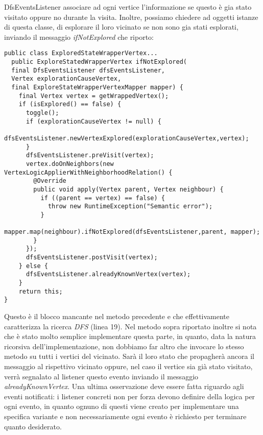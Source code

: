 \begin{paragraph}{DfsEventsListener}
associare ad ogni vertice l'informazione se questo \`e gia stato
visitato oppure no durante la visita. Inoltre, possiamo chiedere ad
oggetti istanze di questa classe, di esplorare il loro vicinato se non
sono gia stati esplorati, inviando il messaggio \emph{ifNotExplored}
che riporto:
\begin{lstlisting}
public class ExploredStateWrapperVertex...
  public ExploreStatedWrapperVertex ifNotExplored(
  final DfsEventsListener dfsEventsListener,
  Vertex explorationCauseVertex,
  final ExploreStateWrapperVertexMapper mapper) {
    final Vertex vertex = getWrappedVertex();
    if (isExplored() == false) {
      toggle();
      if (explorationCauseVertex != null) {
        dfsEventsListener.newVertexExplored(explorationCauseVertex,vertex);
      }
      dfsEventsListener.preVisit(vertex);
      vertex.doOnNeighbors(new VertexLogicApplierWithNeighborhoodRelation() {
        @Override
        public void apply(Vertex parent, Vertex neighbour) {
          if ((parent == vertex) == false) {
            throw new RuntimeException("Semantic error");
          }
          mapper.map(neighbour).ifNotExplored(dfsEventsListener,parent, mapper);
        }
      });
      dfsEventsListener.postVisit(vertex);
    } else {
      dfsEventsListener.alreadyKnownVertex(vertex);
    }
    return this;
}
\end{lstlisting}
Questo \`e il blocco mancante nel metodo precedente e che
effettivamente caratterizza la ricerca \emph{DFS} (linea 19). Nel
metodo sopra riportato inoltre si nota che \`e stato molto semplice
implementare questa parte, in quanto, data la natura ricorsiva
dell'implementazione, non dobbiamo far altro che invocare lo stesso
metodo su tutti i vertici del vicinato. Sar\`a il loro stato che
propagher\`a ancora il messaggio al rispettivo vicinato oppure, nel
caso il vertice sia gi\`a stato visitato, verr\`a segnalato al
listener questo evento inviando il messaggio
\emph{alreadyKnownVertex}. Una ultima osservazione deve essere fatta
riguardo agli eventi notificati: i listener concreti non per forza
devono definire della logica per ogni evento, in quanto ognuno di
questi viene creato per implementare una specifica variante e non
necessariamente ogni evento \`e richiesto per terminare quanto
desiderato.
\end{paragraph}

